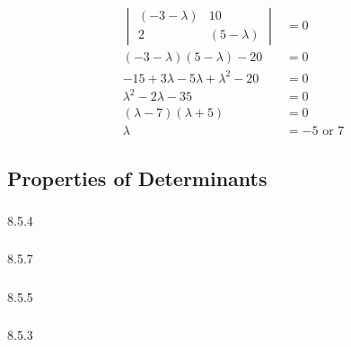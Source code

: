 \documentclass{article}
\begin{document}
\setcounter{subsubsection}{28}
\subsubsection{}

\begin{align*}
  \begin{vmatrix}
    (-3 - \lambda) & 10            \\
    2              & (5 - \lambda)
  \end{vmatrix}            & = 0                                    \\
  (-3 - \lambda) (5 - \lambda) - 20            & = 0                \\
  -15 + 3 \lambda - 5 \lambda + \lambda^2 - 20 & = 0                \\
  \lambda^2 - 2 \lambda - 35                   & = 0                \\
  (\lambda - 7) (\lambda + 5)                  & = 0                \\
  \lambda                                      & = -5 \text{ or } 7
\end{align*}

\subsection{Properties of Determinants}

\subsubsection{}

8.5.4

\setcounter{subsubsection}{2}
\subsubsection{}

8.5.7

\setcounter{subsubsection}{4}
\subsubsection{}

8.5.5

\setcounter{subsubsection}{6}
\subsubsection{}

8.5.3
\end{document}

